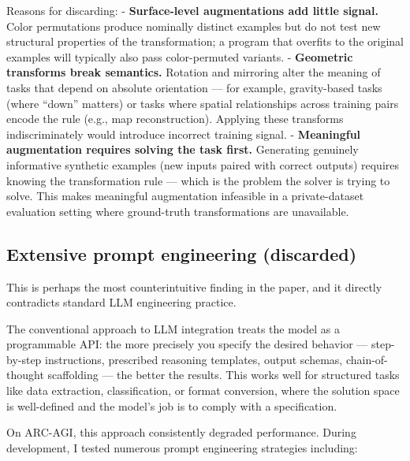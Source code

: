 \documentclass[11pt]{article}
\begin{document}
Reasons for discarding: - \textbf{Surface-level augmentations add little
signal.} Color permutations produce nominally distinct examples but do
not test new structural properties of the transformation; a program that
overfits to the original examples will typically also pass
color-permuted variants. - \textbf{Geometric transforms break
semantics.} Rotation and mirroring alter the meaning of tasks that
depend on absolute orientation --- for example, gravity-based tasks
(where ``down'' matters) or tasks where spatial relationships across
training pairs encode the rule (e.g., map reconstruction). Applying
these transforms indiscriminately would introduce incorrect training
signal. - \textbf{Meaningful augmentation requires solving the task
first.} Generating genuinely informative synthetic examples (new inputs
paired with correct outputs) requires knowing the transformation rule
--- which is the problem the solver is trying to solve. This makes
meaningful augmentation infeasible in a private-dataset evaluation
setting where ground-truth transformations are unavailable.

\hypertarget{extensive-prompt-engineering-discarded}{%
\subsection{Extensive prompt engineering
(discarded)}\label{extensive-prompt-engineering-discarded}}

This is perhaps the most counterintuitive finding in the paper, and it
directly contradicts standard LLM engineering practice.

The conventional approach to LLM integration treats the model as a
programmable API: the more precisely you specify the desired behavior
--- step-by-step instructions, prescribed reasoning templates, output
schemas, chain-of-thought scaffolding --- the better the results. This
works well for structured tasks like data extraction, classification, or
format conversion, where the solution space is well-defined and the
model's job is to comply with a specification.

On ARC-AGI, this approach consistently degraded performance. During
development, I tested numerous prompt engineering strategies including:
\end{document}
